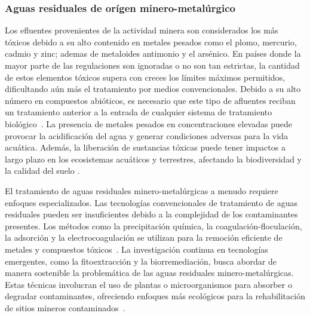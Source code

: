 \subsubsection{Aguas residuales de orígen minero-metalúrgico}
Los efluentes provenientes de la actividad minera son considerados los más tóxicos debido a su alto contenido en metales pesados como el plomo, mercurio, cadmio y zinc; ademas de metaloides antimonio y el arsénico. En países donde la mayor parte de las regulaciones son ignoradas o no son tan estrictas, la cantidad de estos elementos tóxicos supera con creces los límites máximos permitidos, dificultando aún más el tratamiento por medios convencionales. Debido a su alto número en compuestos abióticos, es necesario que este tipo de afluentes reciban un tratamiento anterior a la entrada de cualquier sistema de tratamiento biológico~\citep{lazcano2016}.
La presencia de metales pesados en concentraciones elevadas puede provocar la acidificación del agua y generar condiciones adversas para la vida acuática. Además, la liberación de sustancias tóxicas puede tener impactos a largo plazo en los ecosistemas acuáticos y terrestres, afectando la biodiversidad y la calidad del suelo \citep{Kamberovic2012}.\par
El tratamiento de aguas residuales minero-metalúrgicas a menudo requiere enfoques especializados. Las tecnologías convencionales de tratamiento de aguas residuales pueden ser insuficientes debido a la complejidad de los contaminantes presentes. Los métodos como la precipitación química, la coagulación-floculación, la adsorción y la electrocoagulación se utilizan para la remoción eficiente de metales y compuestos tóxicos\sloppy~\citep{wu2017,Kamberovic2012}. La investigación continua en tecnologías emergentes, como la fitoextracción y la biorremediación, busca abordar de manera sostenible la problemática de las aguas residuales minero-metalúrgicas. Estas técnicas involucran el uso de plantas o microorganismos para absorber o degradar contaminantes, ofreciendo enfoques más ecológicos para la rehabilitación de sitios mineros contaminados~\citep{Sulimova2016}.
